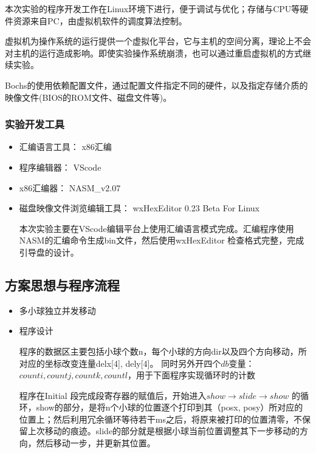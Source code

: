 \documentclass[a4paper,11pt,UTF8]{ctexart}
\begin{document}
	
	本次实验的程序开发工作在Linux环境下进行，便于调试与优化；存储与CPU等硬件资源来自PC，由虚拟机软件的调度算法控制。
	
	虚拟机为操作系统的运行提供一个虚拟化平台，它与主机的空间分离，理论上不会对主机的运行造成影响。即使实验操作系统崩溃，也可以通过重启虚拟机的方式继续实验。
	
	Bochs的使用依赖配置文件，通过配置文件指定不同的硬件，以及指定存储介质的映像文件(BIOS的ROM文件、磁盘文件等)。
	
	 
\subsubsection{实验开发工具}

	\begin{itemize} 
	\item 汇编语言工具： x86汇编
	\item 程序编辑器： VScode 
	\item x86汇编器： NASM\_v2.07
	\item 磁盘映像文件浏览编辑工具： wxHexEditor 0.23 Beta For Linux
	
	本次实验主要在VScode编辑平台上使用汇编语言模式完成。汇编程序使用NASM的汇编命令生成bin文件，然后使用wxHexEditor 检查格式完整，完成引导盘的设计。
\end{itemize}

\subsection{方案思想与程序流程}

	\begin{itemize}
	\item 多小球独立并发移动

	\item 程序设计
	
	程序的数据区主要包括小球个数n，每个小球的方向dir以及四个方向移动，所对应的坐标改变连量delx[4], dely[4]。
	同时另外开四个$db$变量：$counti, countj, countk ,countl$，用于下面程序实现循环时的计数
	
	程序在Initial 段完成段寄存器的赋值后，开始进入$show\rightarrow slide \rightarrow show$ 的循环，show的部分，是将n个小球的位置逐个打印到其（posx, posy）所对应的位置上；然后利用冗余循环等待若干ms之后，将原来被打印的位置清零，不保留上次移动的痕迹。slide的部分就是根据小球当前位置调整其下一步移动的方向，然后移动一步，并更新其位置。
	
	
	
	
\end{itemize}
	
\end{document}
